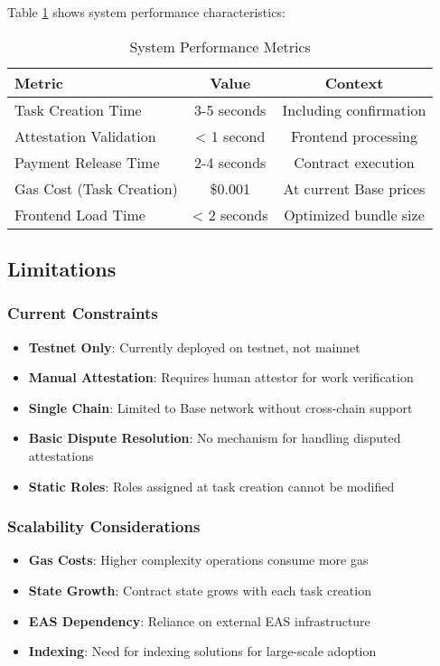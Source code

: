 \documentclass[12pt,a4paper]{article}
\begin{document}
Table \ref{tab:performance-metrics} shows system performance characteristics:

\begin{table}[h]
\centering
\begin{tabular}{|l|c|c|}
\hline
\textbf{Metric} & \textbf{Value} & \textbf{Context} \\
\hline
Task Creation Time & 3-5 seconds & Including confirmation \\
\hline
Attestation Validation & < 1 second & Frontend processing \\
\hline
Payment Release Time & 2-4 seconds & Contract execution \\
\hline
Gas Cost (Task Creation) & \$0.001 & At current Base prices \\
\hline
Frontend Load Time & < 2 seconds & Optimized bundle size \\
\hline
\end{tabular}
\caption{System Performance Metrics}
\label{tab:performance-metrics}
\end{table}

\subsection{Limitations}

\subsubsection{Current Constraints}
\begin{itemize}
    \item \textbf{Testnet Only}: Currently deployed on testnet, not mainnet
    \item \textbf{Manual Attestation}: Requires human attestor for work verification
    \item \textbf{Single Chain}: Limited to Base network without cross-chain support
    \item \textbf{Basic Dispute Resolution}: No mechanism for handling disputed attestations
    \item \textbf{Static Roles}: Roles assigned at task creation cannot be modified
\end{itemize}

\subsubsection{Scalability Considerations}
\begin{itemize}
    \item \textbf{Gas Costs}: Higher complexity operations consume more gas
    \item \textbf{State Growth}: Contract state grows with each task creation
    \item \textbf{EAS Dependency}: Reliance on external EAS infrastructure
    \item \textbf{Indexing}: Need for indexing solutions for large-scale adoption
\end{itemize}
\end{document}
